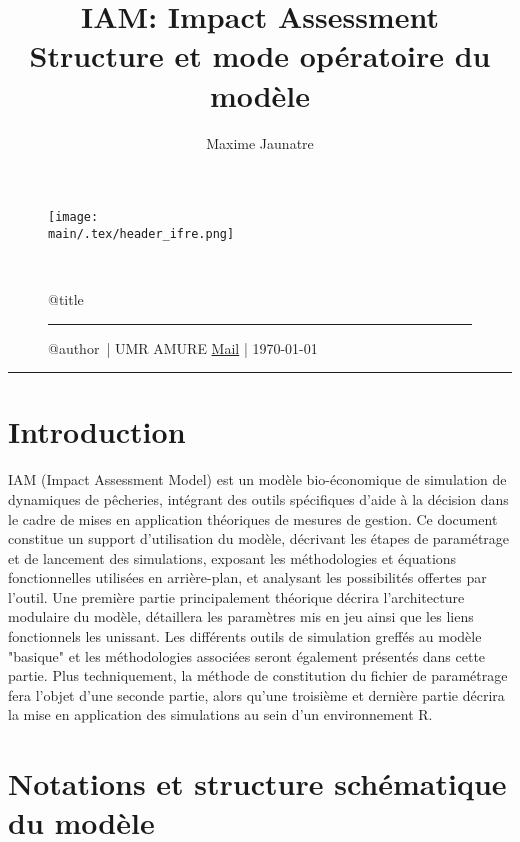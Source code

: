 \documentclass[12pt, colorinlistoftodos]{article}
\title{IAM:  Impact Assessment \\ Structure et mode opératoire du modèle}
\author{Maxime Jaunatre}
\providecommand{\main}{.}  %
\begin{document}
\thispagestyle{plain}

\begin{figure}
    \texttt{[image: \\main/.tex/header\_ifre.png]}
    \par ~ \par
    \begin{minipage}{\textwidth}
        \begin{center}
            {\huge \csname @title\endcsname }
        \end{center}
        \rule{7em}{.4pt}\par
        \csname @author\endcsname ~| UMR AMURE \hfill %
        \href{mailto:maxime.jaunatre@ifremer.fr}{Mail} | \today
    \end{minipage}
\end{figure}
\hrule

\iffalse

\section{Introduction}

IAM (Impact Assessment Model) est un modèle bio-économique de simulation de dynamiques de pêcheries, 
intégrant des outils spécifiques d'aide à la décision dans le cadre de mises en application théoriques de mesures de gestion.  
Ce document constitue un support d'utilisation du modèle, décrivant les étapes de paramétrage et de lancement des simulations, 
exposant les méthodologies et équations fonctionnelles utilisées en arrière-plan, et analysant les possibilités offertes par l'outil. 
Une première partie  principalement théorique décrira l'architecture modulaire du modèle, 
détaillera les paramètres mis en jeu ainsi que les liens fonctionnels les unissant. Les différents outils de simulation 
greffés au modèle "basique" et les méthodologies associées seront également présentés dans cette partie. 
Plus techniquement, la méthode de constitution du fichier de paramétrage fera l'objet d'une seconde partie, 
alors qu'une troisième et dernière partie décrira la mise en application des simulations au sein d'un environnement R.



\section{Notations et structure schématique du modèle}
\end{document}
